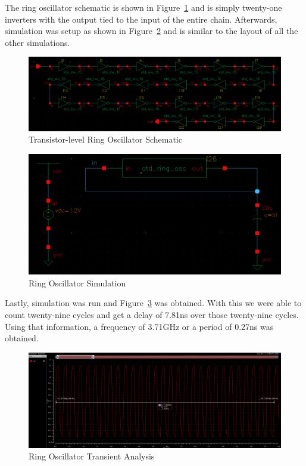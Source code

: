 \documentclass[12pt]{article}
\begin{document}
The ring oscillator schematic is shown in Figure~\ref{fig:ring_osc_schem} and is simply twenty-one inverters with the
output tied to the input of the entire chain. Afterwards, simulation was setup as shown in Figure~\ref{fig:ring_osc_sim}
and is similar to the layout of all the other simulations.
\begin{figure}[!htb]
    \centering
    \includegraphics[width=5in]{figures/ring_osc_schem.png}
    \caption{Transistor-level Ring Oscillator Schematic}\label{fig:ring_osc_schem}
\end{figure}
\begin{figure}[!htb]
    \centering
    \includegraphics[width=5in]{figures/ring_osc_sim.png}
    \caption{Ring Oscillator Simulation}\label{fig:ring_osc_sim}
\end{figure}

Lastly, simulation was run and Figure~\ref{fig:ring_osc_tran} was obtained. With this we were able to count twenty-nine
cycles and get a delay of 7.81ns over those twenty-nine cycles. Using that information, a frequency of 3.71GHz or a period of
0.27ns was obtained.
\begin{figure}[!htb]
    \centering
    \includegraphics[width=5in]{figures/ring_osc_tran.png}
    \caption{Ring Oscillator Transient Analysis}\label{fig:ring_osc_tran}
\end{figure}
\end{document}
